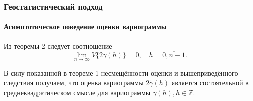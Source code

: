 \documentclass{beamer}
\begin{document}
\begin{frame}
  \frametitle{Геостатистический подход}
  \framesubtitle{Асимптотическое поведение оценки вариограммы}
  \begin{Corollary}
    Из теоремы 2 следует соотношение
    \begin{equation*}
      \lim_{n \to \infty} V\{ 2 \tilde{\gamma}(h) \} = 0, \quad h = \overline{0, n - 1}.
    \end{equation*}
  \end{Corollary}

  \begin{Corollary}
    В силу показанной в теореме 1 несмещённости оценки и вышеприведённого следствия получаем, что оценка вариограммы $ 2\tilde{\gamma}(h) $ является состоятельной в среднеквадратическом смысле для вариограммы $ \gamma(h), h \in \mathbb{Z} $.
  \end{Corollary}
\end{frame}
\end{document}
